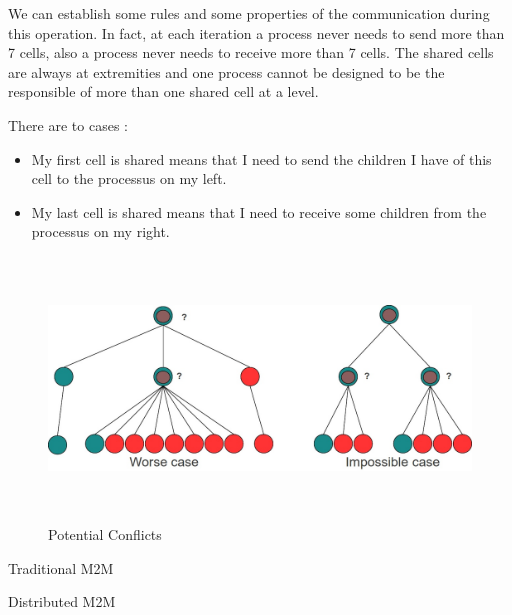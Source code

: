 \documentclass[12pt,letterpaper,titlepage]{report}
\begin{document}
We can establish some rules and some properties of the communication
during this operation.  In fact, at each iteration a process never
needs to send more than 7 cells, also a process never needs to receive
more than 7 cells.  The shared cells are always at extremities and one
process cannot be designed to be the responsible of more than one
shared cell at a level. 

There are to cases : 
\begin{itemize}
  \item My first cell is shared means that I need to send the children I have of
    this cell to the processus on my left.
  \item My last cell is shared means that I need to receive some
    children from the processus on my right.
\end{itemize}


\begin{figure}[h!]
  \begin{center}
    \includegraphics[width=14cm, height=7cm, keepaspectratio=true]{ruleillu.jpg}
    \caption{Potential Conflicts}
  \end{center}
\end{figure}

\begin{algorithm}[H]
  \LinesNumbered
  \SetAlgoLined
  \BlankLine
  \BlankLine
  \caption{Traditional M2M}
\end{algorithm}
\begin{algorithm}[H]
  \LinesNumbered
  \SetAlgoLined
  \BlankLine
  \BlankLine
  \caption{Distributed M2M}
\end{algorithm}
\end{document}
